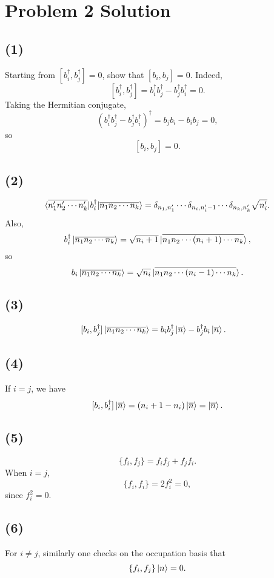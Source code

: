 \documentclass[12pt]{article}
\begin{document}
\section*{Problem 2 Solution}

\subsection*{(1)}
Starting from $[b_i^\dagger,b_j^\dagger]=0$, show that $[b_i,b_j]=0$.  
Indeed,
\[
[b_i^\dagger,b_j^\dagger]=b_i^\dagger b_j^\dagger - b_j^\dagger b_i^\dagger=0.
\]
Taking the Hermitian conjugate,
\[
(b_i^\dagger b_j^\dagger - b_j^\dagger b_i^\dagger)^\dagger = b_j b_i - b_i b_j = 0,
\]
so
\[
[b_i,b_j]=0.
\]

\subsection*{(2)}
\[
\braket{\overline{n_1' n_2' \cdots n_k'}|b_i^\dagger|\overline{n_1 n_2 \cdots n_k}}
=\delta_{n_1,n_1'}\cdots \delta_{n_i,n_i'-1}\cdots \delta_{n_k,n_k'}\sqrt{n_i'}.
\]
Also,
\[
b_i^\dagger \ket{\overline{n_1 n_2 \cdots n_k}} = \sqrt{n_i + 1} \ket{\overline{n_1 n_2 \cdots (n_i + 1) \cdots n_k}},
\]
so
\[
b_i \ket{\overline{n_1 n_2 \cdots n_k}} = \sqrt{n_i} \ket{\overline{n_1 n_2 \cdots (n_i - 1) \cdots n_k}}.
\]

\subsection*{(3)}
\[
\begin{aligned}
[b_i, b_j^\dagger] \ket{\overline{n_1 n_2 \cdots n_k}}
&= b_i b_j^\dagger \ket{\overline{n}} - b_j^\dagger b_i \ket{\overline{n}}.
\end{aligned}
\]

\subsection*{(4)}
If $i = j$, we have
\[
[b_i, b_i^\dagger] \ket{\overline{n}} 
= (n_i + 1 - n_i) \ket{\overline{n}} 
= \ket{\overline{n}}.
\]

\subsection*{(5)}
\[
\{f_i, f_j\} = f_i f_j + f_j f_i.
\]
When $i = j$,
\[
\{f_i, f_i\} = 2 f_i^2 = 0,
\]
since $f_i^2=0$.

\subsection*{(6)}
For $i \neq j$, similarly one checks on the occupation basis that
\[
\{f_i, f_j\} \ket{n}=0.
\]
\end{document}
